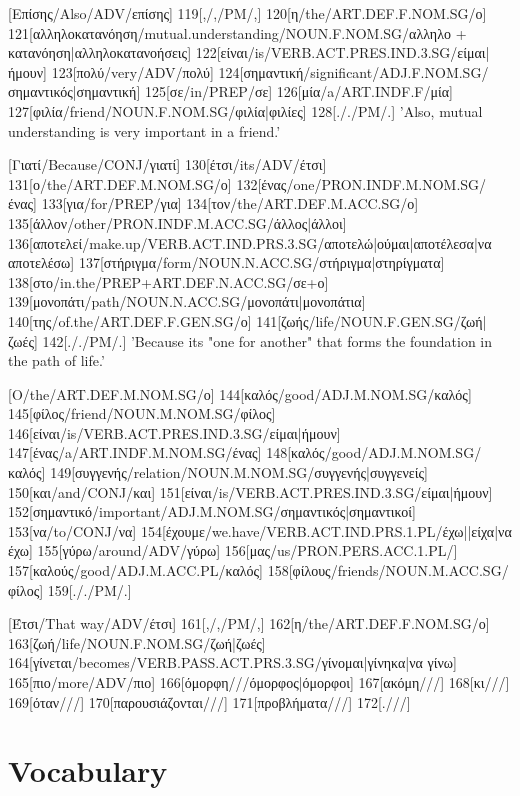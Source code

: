 \documentclass[extrafontsizes,17pt]{memoir}
\begin{document}
\a

[Επίσης/Also/ADV/επίσης]
119[,/,/PM/,]
120[η/the/ART.DEF.F.NOM.SG/ο]
121[αλληλοκατανόηση/mutual.understanding/NOUN.F.NOM.SG/αλληλο + κατανόηση|αλληλοκατανοήσεις]
122[είναι/is/VERB.ACT.PRES.IND.3.SG/είμαι|ήμουν]
123[πολύ/very/ADV/πολύ]
124[σημαντική/significant/ADJ.F.NOM.SG/σημαντικός|σημαντική]
125[σε/in/PREP/σε]
126[μία/a/ART.INDF.F/μία]
127[φιλία/friend/NOUN.F.NOM.SG/φιλία|φιλίες]
128[././PM/.] 
\glft 
'Also, mutual understanding is very important in a friend.'
\endgl

\a

[Γιατί/Because/CONJ/γιατί]
130[έτσι/its/ADV/έτσι]
131[ο/the/ART.DEF.M.NOM.SG/ο]
132[ένας/one/PRON.INDF.M.NOM.SG/ένας]
133[για/for/PREP/για]
134[τον/the/ART.DEF.M.ACC.SG/ο]
135[άλλον/other/PRON.INDF.M.ACC.SG/άλλος|άλλοι]
136[αποτελεί/make.up/VERB.ACT.IND.PRS.3.SG/αποτελώ|ούμαι|αποτέλεσα|να αποτελέσω]
137[στήριγμα/form/NOUN.N.ACC.SG/στήριγμα|στηρίγματα]
138[στο/in.the/PREP+ART.DEF.N.ACC.SG/σε+ο]
139[μονοπάτι/path/NOUN.N.ACC.SG/μονοπάτι|μονοπάτια]
140[της/of.the/ART.DEF.F.GEN.SG/ο]
141[ζωής/life/NOUN.F.GEN.SG/ζωή|ζωές]
142[././PM/.]
\glft 
'Because its "one for another" that forms the foundation in the path of life.'
\endgl

\a

[Ο/the/ART.DEF.M.NOM.SG/ο]
144[καλός/good/ADJ.M.NOM.SG/καλός]
145[φίλος/friend/NOUN.M.NOM.SG/φίλος]
146[είναι/is/VERB.ACT.PRES.IND.3.SG/είμαι|ήμουν]
147[ένας/a/ART.INDF.M.NOM.SG/ένας]
148[καλός/good/ADJ.M.NOM.SG/καλός]
149[συγγενής/relation/NOUN.M.NOM.SG/συγγενής|συγγενείς]
150[και/and/CONJ/και]
151[είναι/is/VERB.ACT.PRES.IND.3.SG/είμαι|ήμουν]
152[σημαντικό/important/ADJ.M.NOM.SG/σημαντικός|σημαντικοί]
153[να/to/CONJ/να]
154[έχουμε/we.have/VERB.ACT.IND.PRS.1.PL/έχω||είχα|να έχω]
155[γύρω/around/ADV/γύρω]
156[μας/us/PRON.PERS.ACC.1.PL/]
157[καλούς/good/ADJ.M.ACC.PL/καλός]
158[φίλους/friends/NOUN.M.ACC.SG/φίλος]
159[././PM/.]
\glft 
\endgl

\a

[Έτσι/That way/ADV/έτσι]
161[,/,/PM/,]
162[η/the/ART.DEF.F.NOM.SG/ο]
163[ζωή/life/NOUN.F.NOM.SG/ζωή|ζωές]
164[γίνεται/becomes/VERB.PASS.ACT.PRS.3.SG/γίνομαι|γίνηκα|να γίνω]
165[πιο/more/ADV/πιο]
166[όμορφη///όμορφος|όμορφοι]
167[ακόμη///]
168[κι///]
169[όταν///]
170[παρουσιάζονται///]
171[προβλήματα///]
172[.///]
\glft 
\endgl

\xe

\endgroup

\section{Vocabulary}
\end{document}
